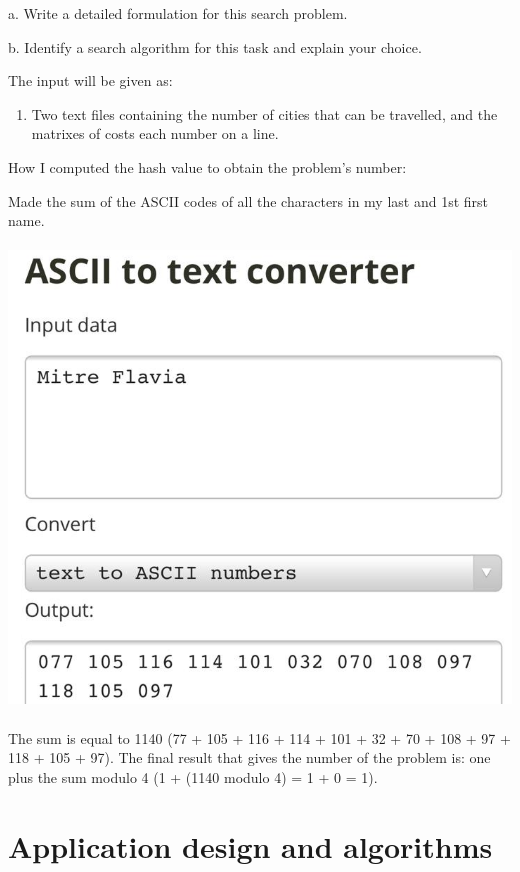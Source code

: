 \documentclass{article}
\begin{document}
 \linebreak
 
a. Write a detailed formulation for this search problem.

b. Identify a search algorithm for this task and explain your choice.\\
\linebreak

The input will be given as:
	
	\begin{enumerate}	\item Two text files containing the number of cities that can be travelled, and the matrixes of costs each number on a line.
		\end{enumerate}
		\pagebreak
How I computed the hash
value to obtain the problem's number:

Made the sum of the ASCII codes of all the characters in my last and 1st first name.
\\
\\
\includegraphics[scale=0.35]{asciiConvName.png}
\\
\\

The sum is equal to 1140 (77 + 105 + 116 + 114 + 101 + 32 + 70 + 108 + 97 + 118 + 105 + 97).
The final result that gives the number of the problem is: one plus the sum modulo 4 (1 + (1140 modulo 4) = 1 + 0 = 1).
 	\pagebreak
\section{Application design and algorithms}
\end{document}
